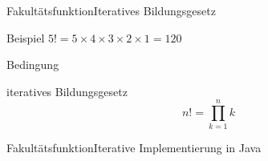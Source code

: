 
\begin{frame}[shrink]{Fakultätsfunktion}{Iteratives Bildungsgesetz}
    \begin{block}{Beispiel}
        $5! = 5\times 4\times 3\times 2\times 1 = 120$
    \end{block}
    \begin{block}{Bedingung}
    \end{block}
    \begin{block}{iteratives Bildungsgesetz}
        \[n! = \prod_{k=1}^{n}k\]
    \end{block}
\end{frame}


\begin{frame}{Fakultätsfunktion}{Iterative Implementierung in Java}
\end{frame}


